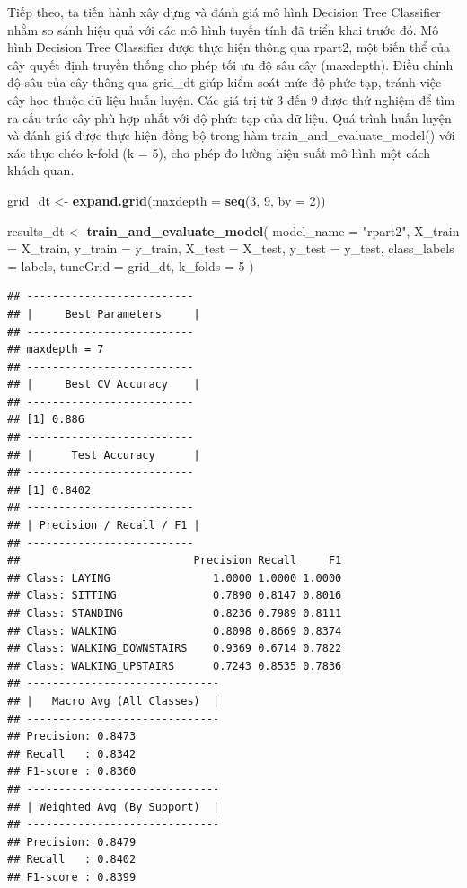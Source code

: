 \documentclass[
]{article}
\newenvironment{Shaded}{\begin{snugshade}}{\end{snugshade}}
\newcommand{\AttributeTok}[1]{\textcolor[rgb]{0.13,0.29,0.53}{#1}}
\newcommand{\DecValTok}[1]{\textcolor[rgb]{0.00,0.00,0.81}{#1}}
\newcommand{\FunctionTok}[1]{\textcolor[rgb]{0.13,0.29,0.53}{\textbf{#1}}}
\newcommand{\NormalTok}[1]{#1}
\newcommand{\OtherTok}[1]{\textcolor[rgb]{0.56,0.35,0.01}{#1}}
\newcommand{\StringTok}[1]{\textcolor[rgb]{0.31,0.60,0.02}{#1}}
\begin{document}
Tiếp theo, ta tiến hành xây dựng và đánh giá mô hình Decision Tree
Classifier nhằm so sánh hiệu quả với các mô hình tuyến tính đã triển
khai trước đó. Mô hình Decision Tree Classifier được thực hiện thông qua
rpart2, một biến thể của cây quyết định truyền thống cho phép tối ưu độ
sâu cây (maxdepth). Điều chỉnh độ sâu của cây thông qua grid\_dt giúp
kiểm soát mức độ phức tạp, tránh việc cây học thuộc dữ liệu huấn luyện.
Các giá trị từ 3 đến 9 được thử nghiệm để tìm ra cấu trúc cây phù hợp
nhất với độ phức tạp của dữ liệu. Quá trình huấn luyện và đánh giá được
thực hiện đồng bộ trong hàm train\_and\_evaluate\_model() với xác thực
chéo k-fold (k = 5), cho phép đo lường hiệu suất mô hình một cách khách
quan.

\begin{Shaded}
\begin{Highlighting}[]
\NormalTok{grid\_dt }\OtherTok{\textless{}{-}} \FunctionTok{expand.grid}\NormalTok{(}\AttributeTok{maxdepth =} \FunctionTok{seq}\NormalTok{(}\DecValTok{3}\NormalTok{, }\DecValTok{9}\NormalTok{, }\AttributeTok{by =} \DecValTok{2}\NormalTok{))}

\NormalTok{results\_dt }\OtherTok{\textless{}{-}} \FunctionTok{train\_and\_evaluate\_model}\NormalTok{(}
  \AttributeTok{model\_name =} \StringTok{"rpart2"}\NormalTok{,}
  \AttributeTok{X\_train =}\NormalTok{ X\_train,}
  \AttributeTok{y\_train =}\NormalTok{ y\_train,}
  \AttributeTok{X\_test =}\NormalTok{ X\_test,}
  \AttributeTok{y\_test =}\NormalTok{ y\_test,}
  \AttributeTok{class\_labels =}\NormalTok{ labels,}
  \AttributeTok{tuneGrid =}\NormalTok{ grid\_dt,}
  \AttributeTok{k\_folds =} \DecValTok{5}
\NormalTok{)}
\end{Highlighting}
\end{Shaded}

\begin{verbatim}
## --------------------------
## |     Best Parameters     |
## --------------------------
## maxdepth = 7
## --------------------------
## |     Best CV Accuracy    |
## --------------------------
## [1] 0.886
## --------------------------
## |      Test Accuracy      |
## --------------------------
## [1] 0.8402
## --------------------------
## | Precision / Recall / F1 |
## --------------------------
##                           Precision Recall     F1
## Class: LAYING                1.0000 1.0000 1.0000
## Class: SITTING               0.7890 0.8147 0.8016
## Class: STANDING              0.8236 0.7989 0.8111
## Class: WALKING               0.8098 0.8669 0.8374
## Class: WALKING_DOWNSTAIRS    0.9369 0.6714 0.7822
## Class: WALKING_UPSTAIRS      0.7243 0.8535 0.7836
## ------------------------------
## |   Macro Avg (All Classes)  |
## ------------------------------
## Precision: 0.8473
## Recall   : 0.8342
## F1-score : 0.8360
## ------------------------------
## | Weighted Avg (By Support)  |
## ------------------------------
## Precision: 0.8479
## Recall   : 0.8402
## F1-score : 0.8399
\end{verbatim}
\end{document}
